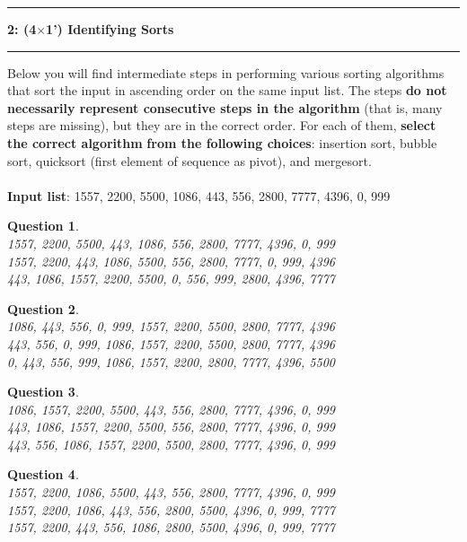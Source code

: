 \documentclass[10.5pt]{article}
\newcommand\question[2]{\vspace{.25in}\hrule\textbf{#1: #2}\vspace{.5em}\hrule\vspace{.10in}}
\newtheorem{Q}{Question}
\begin{document}
\question{2}{(4$\times$1') Identifying Sorts}
    Below you will find intermediate steps in performing various sorting algorithms that sort the input in ascending order on the same input list. The steps \textbf{do not necessarily represent consecutive steps in the algorithm} (that is, many steps are missing), but they are in the correct order. For each of them, \textbf{select the correct algorithm} \textbf{from the
following choices}: insertion sort, bubble sort, quicksort (first element of sequence as pivot), and mergesort.
\\\\
\textbf{Input list}: 1557, 2200, 5500, 1086, 443, 556, 2800, 7777, 4396, 0, 999

\begin{Q} \textcolor{white}{ }\\
1557, 2200, 5500, 443, 1086, 556, 2800, 7777, 4396, 0, 999\\
1557, 2200, 443, 1086, 5500, 556, 2800, 7777, 0, 999, 4396\\
443, 1086, 1557, 2200, 5500, 0, 556, 999, 2800, 4396, 7777\\

\vspace{1cm}
\end{Q}

\begin{Q}\textcolor{white}{ }\\
1086, 443, 556, 0, 999, 1557, 2200, 5500, 2800, 7777, 4396\\
443, 556, 0, 999, 1086, 1557, 2200, 5500, 2800, 7777, 4396\\
0, 443, 556, 999, 1086, 1557, 2200, 2800, 7777, 4396, 5500\\

\vspace{1cm}
\end{Q}

\begin{Q}\textcolor{white}{ }\\
1086, 1557, 2200, 5500, 443, 556, 2800, 7777, 4396, 0, 999\\
443, 1086, 1557, 2200, 5500, 556, 2800, 7777, 4396, 0, 999\\
443, 556, 1086, 1557, 2200, 5500, 2800, 7777, 4396, 0, 999\\

\vspace{1cm}
\end{Q}

\begin{Q}\textcolor{white}{ }\\
1557, 2200, 1086, 5500, 443, 556, 2800, 7777, 4396, 0, 999\\
1557, 2200, 1086, 443, 556, 2800, 5500, 4396, 0, 999, 7777\\
1557, 2200, 443, 556, 1086, 2800, 5500, 4396, 0, 999, 7777\\

\vspace{1cm}
\end{Q}
	
\end{document}
